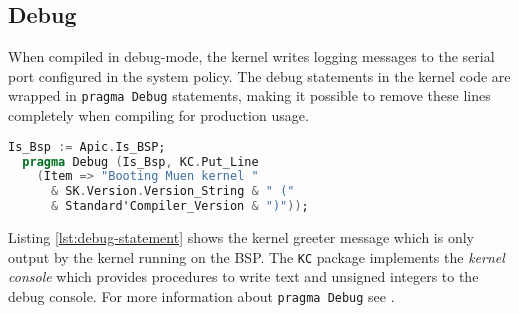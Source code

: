 \subsection{Debug}\label{subsec:debug}
When compiled in debug-mode, the kernel writes logging messages to
the serial port configured in the system policy. The debug statements in the
kernel code are wrapped in \texttt{pragma Debug} statements,
making it possible to remove these lines completely when compiling for production
usage.

\begin{lstlisting}[language=Ada, label=lst:debug-statement, caption=Kernel debug
statement]
  Is_Bsp := Apic.Is_BSP;
  pragma Debug (Is_Bsp, KC.Put_Line
    (Item => "Booting Muen kernel "
      & SK.Version.Version_String & " ("
      & Standard'Compiler_Version & ")"));
\end{lstlisting}

Listing \ref{lst:debug-statement} shows the kernel greeter message which is only
output by the kernel running on the BSP. The \texttt{KC}
package implements the \emph{kernel console} which provides procedures to write
text and unsigned integers to the debug console. For more information about
\texttt{pragma Debug} see \cite{GNAT:manual}.
